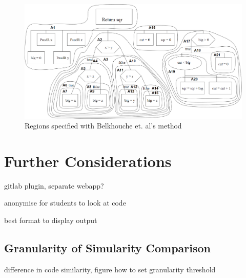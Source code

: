 \begin{figure}[h!]
	\centering
		\includegraphics[width=\textwidth]{Figures/Belkhouche}
	\caption{Regions specified with Belkhouche et. al's method~\cite{Belkhouche}}
	\label{fig:BelkhoucheComparison}
\end{figure}



\section{Further Considerations}

gitlab plugin, separate webapp?

anonymise for students to look at code

best format to display output

\subsection{Granularity of Simularity Comparison}
\label{subsec:SimGranularity}
difference in code similarity, figure how to set granularity threshold